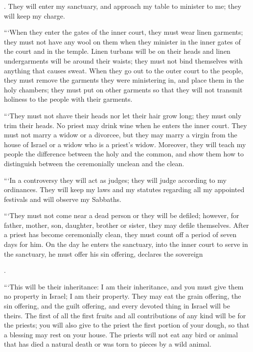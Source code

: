 {{}.
They
will enter
my sanctuary,
and approach
my table
to minister
to me;
they will keep
my charge.
\par }{\PP {}“‘When
they enter
the gates
of the inner
court,
they must wear
linen
garments;
they must not
have any wool
on them when they minister
in the inner
gates
of the court
and in the temple.
Linen
turbans
will be
on
their heads
and linen
undergarments
will be
around their waists;
they must not
bind themselves with anything that causes sweat.
When they go out
to
the outer
court
to
the people,
they must remove
the
garments
they
were ministering
in, and place them in
the
holy
chambers;
they must put on
other
garments
so that they will not
transmit holiness
to the people
with their garments.
\par }{\PP {}“‘They must not
shave
their heads
nor
let their hair
grow long; they must only trim
their heads.
No
priest
may drink
wine
when he enters
the inner
court.
They must not
marry
a widow
or a divorcee,
but
they may
marry a virgin
from the house
of Israel
or a widow
who is a priest’s
widow.
Moreover, they will teach
my people
the difference
between
the holy
and the common, and show them how to distinguish
between
the ceremonially unclean
and the clean.
\par }{\PP {}“‘In a controversy
they
will act as judges;
they will judge
according to my ordinances.
They will keep my laws
and my statutes
regarding all
my appointed festivals
and will observe
my Sabbaths.
\par }{\PP {}“‘They must not
come
near a dead
person
or
they will be defiled;
however,
for
father,
mother,
son,
daughter,
brother
or
sister,
they may
defile themselves.
After
a priest has become ceremonially clean,
they must count
off a period of seven
days for him.
On the day
he enters
the sanctuary,
into
the inner
court
to serve
in the sanctuary,
he must offer
his sin offering,
declares
the sovereign

{}.
\par }{\PP {}“‘This will be
their inheritance: I am
their inheritance,
and you must give
them no
property
in Israel;
I am
their property.
They
may eat
the grain offering,
the sin offering,
and the guilt offering,
and every
devoted
thing in Israel
will be theirs.
The first
of all
the first fruits
and all
contributions
of any
kind
will be
for the priests;
you will also give
to the priest
the first portion
of your dough,
so that a blessing
may rest
on
your house.
The priests
will not
eat
any
bird
or animal
that has died a natural death
or was torn
to pieces by a wild animal.

}
